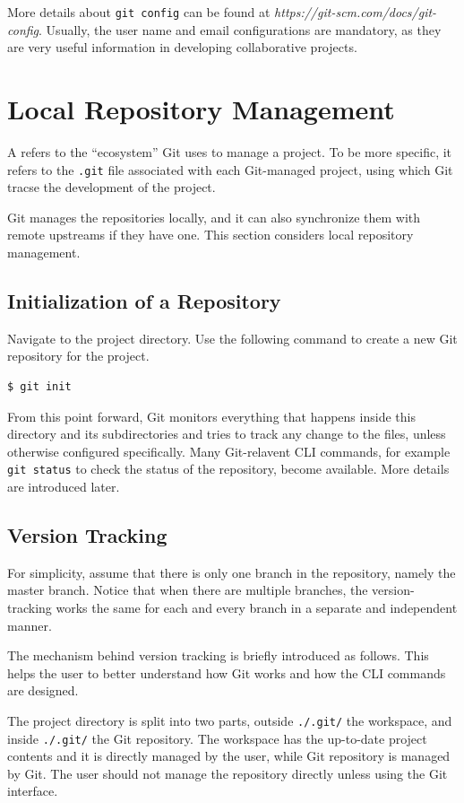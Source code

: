 More details about \verb|git config| can be found at \textit{https://git-scm.com/docs/git-config}. Usually, the user name and email configurations are mandatory, as they are very useful information in developing collaborative projects.

\section{Local Repository Management}

A  refers to the ``ecosystem'' Git uses to manage a project. To be more specific, it refers to the \verb|.git| file associated with each Git-managed project, using which Git tracse the development of the project. 

Git manages the repositories locally, and it can also synchronize them with remote upstreams if they have one. This section considers local repository management.

\subsection{Initialization of a Repository}

Navigate to the project directory. Use the following command to create a new Git repository for the project.
\begin{lstlisting}
$ git init
\end{lstlisting}
From this point forward, Git monitors everything that happens inside this directory and its subdirectories and tries to track any change to the files, unless otherwise configured specifically. Many Git-relavent CLI commands, for example \verb|git status| to check the status of the repository, become available. More details are introduced later.

\subsection{Version Tracking}

For simplicity, assume that there is only one branch in the repository, namely the master branch. Notice that when there are multiple branches, the version-tracking works the same for each and every branch in a separate and independent manner.

The mechanism behind version tracking is briefly introduced as follows. This helps the user to better understand how Git works and how the CLI commands are designed.

The project directory is split into two parts, outside \verb|./.git/| the workspace, and inside \verb|./.git/| the Git repository. The workspace has the up-to-date project contents and it is directly managed by the user, while Git repository is managed by Git. The user should not manage the repository directly unless using the Git interface.

